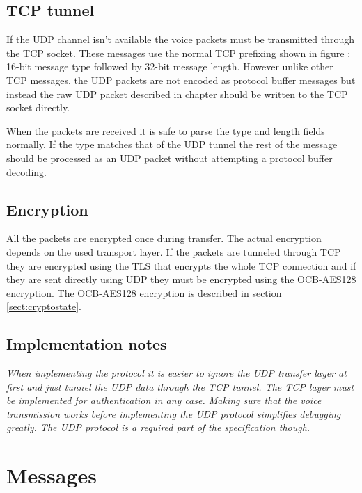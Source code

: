 \documentclass[11pt]{article} %
\begin{document}
\subsection{TCP tunnel}
\label{sect:udptunnel}

If the UDP channel isn't available the voice packets must be transmitted through the TCP socket. These messages use the normal TCP prefixing shown in figure \label{fig:mumble_packet}: 16-bit message type followed by 32-bit message length. However unlike other TCP messages, the UDP packets are not encoded as protocol buffer messages but instead the raw UDP packet described in chapter \label{sect:udpdata} should be written to the TCP socket directly.

When the packets are received it is safe to parse the type and length fields normally. If the type matches that of the UDP tunnel the rest of the message should be processed as an UDP packet without attempting a protocol buffer decoding.

\subsection{Encryption}
\label{sect:udpencryption}

All the packets are encrypted once during transfer. The actual encryption depends on the used transport layer. If the packets are tunneled through TCP they are encrypted using the TLS that encrypts the whole TCP connection and if they are sent directly using UDP they must be encrypted using the OCB-AES128 encryption. The OCB-AES128 encryption is described in section \ref{sect:cryptostate}.

\subsection{Implementation notes}

\emph{\small{When implementing the protocol it is easier to ignore the UDP transfer layer at first and just tunnel the UDP data through the TCP tunnel. The TCP layer must be implemented for authentication in any case. Making sure that the voice transmission works before implementing the UDP protocol simplifies debugging greatly. The UDP protocol is a required part of the specification though.}}

\section{Messages}
\end{document}
